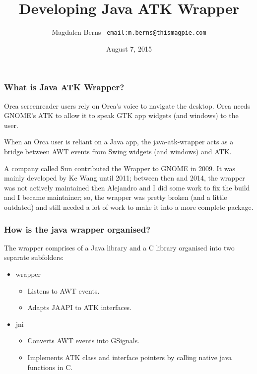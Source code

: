 \documentclass[aspectratio=169]{beamer}
\title[Developing Java ATK Wrapper]{Developing Java ATK Wrapper}
\author{Magdalen Berns \ \texttt{email:m.berns@thismagpie.com}}
\date{August 7, 2015}
\begin{document}
\begin{frame}[containsverbatim]
\titlepage
\end{frame}

\begin{frame}[containsverbatim]
\frametitle{What is Java ATK Wrapper?}
 \begin{center}
Orca screenreader users rely on Orca's voice to navigate the desktop. Orca needs GNOME's ATK to allow it to speak GTK app widgets (and windows) to the user.
\end{center}

\begin{center}
When an Orca user is reliant on a Java app, the java-atk-wrapper acts as a bridge between AWT events from Swing widgets (and windows) and ATK.
\end{center}

\begin{center}
A company called Sun contributed the Wrapper to GNOME in 2009. It was mainly developed by Ke Wang until 2011; between then and 2014, the wrapper was not actively maintained then Alejandro and I did some work to fix the build and I became maintainer; so, the wrapper was pretty broken (and a little outdated) and still needed a lot of work to make it into a more complete package.
\end{center}
\end{frame}

\begin{frame}[containsverbatim]
\frametitle{How is the java wrapper organised?}
The wrapper comprises of a Java library and a C library organised into two separate subfolders:
    \begin{itemize}
        \item wrapper
            \begin{itemize}
        		\item Listens to AWT events.
		\item Adapts JAAPI to ATK interfaces.
	    \end{itemize}
        \item  jni
       \begin{itemize}
        	\item Converts AWT events into GSignals.
	\item Implements ATK class and interface pointers by calling native java functions in C.
    \end{itemize}
    \end{itemize}
\end{frame}
\end{document}
